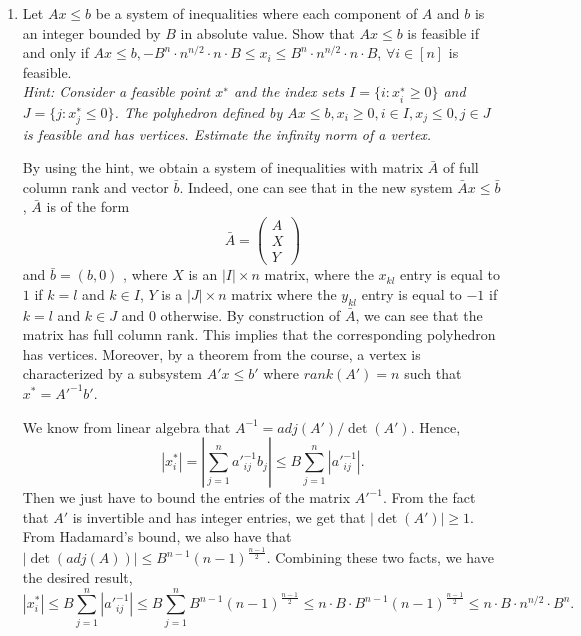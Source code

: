 \documentclass[11pt]{article}
\renewcommand{\leq}{\leqslant}
\begin{document}
\begin{enumerate}[1)]
\item Let $Ax≤b$ be a system of inequalities where each component of $A$ and $b$ is an integer bounded by
$B$ in absolute value. Show that $Ax≤b$ is feasible if and only if $Ax≤b ,−B^n \cdot n^{n/2}\cdot n\cdot B ≤x_i ≤ B^n\cdot n^{n/2}\cdot n\cdot B$, $∀i∈[n]$ is feasible. \\

\textit{Hint: Consider a feasible point $x^∗$ and the index sets $I= \{i: x^∗_i ≥0\}$ and $J= \{j : x^∗_j ≤0\}$. The
polyhedron defined by $Ax≤b, x_i ≥0, i∈I, x_j ≤0, j ∈J$ is feasible and has vertices. Estimate the infinity norm of a vertex.}

\begin{solution}
By using the hint, we obtain a system of inequalities with matrix $\bar{A}$ of full column rank and vector $\bar{b}$. Indeed, one can see that in the new system $\bar{A}x≤\bar{b}$, $\bar{A}$ is of the form $$\bar{A} = \begin{pmatrix} A \\ X \\ Y \end{pmatrix}$$ 
and $\bar{b}= (b, 0)$ , where $X$ is an $|I|×n$ matrix, where the $x_{kl}$ entry is equal to $1$ if $k=l$ and $k ∈I$,
$Y$ is a $|J|×n$ matrix where the $y_{kl}$ entry is equal to $-1$ if $k= l$ and $k ∈J$ and $0$ otherwise.
By construction of $\bar{A}$, we can see that the matrix has full column rank.
This implies that the corresponding polyhedron has vertices. Moreover, by a theorem from the
course, a vertex is characterized by a subsystem $A'x≤b'$ where $rank(A') = n$ such that $x^\ast
= A'^{−1}b'$.

We know from linear algebra that $A^{−1 }= adj(A')/\det(A').$
Hence,
$$|x^\ast_i| = \left| \displaystyle\sum_{j =1}^n {a'}_{ij}^{-1} b_j \right| \leq B \displaystyle\sum_{j =1}^n \left|  {a'}_{ij}^{-1} \right|.$$
Then we just have to bound the entries of the matrix $A'^{−1}$. From the fact that $A'$ is invertible and has integer entries, we get that $|\det(A')| ≥ 1$. From Hadamard’s bound, we also have that
$|\det(adj(A))|≤B^{n−1}(n−1)^{\frac{n−1}{2}}$. Combining these two facts, we have the desired result,
$$|x^\ast_i| \leq B \displaystyle\sum_{j =1}^n \left|  {a'}_{ij}^{-1} \right| \leq B \displaystyle\sum_{j =1}^n B^{n-1} (n-1)^{\frac{n-1}{2}} \leq n \cdot B \cdot B^{n-1} (n-1)^{\frac{n-1}{2}} \leq n\cdot B \cdot n^{n/2} \cdot B^n.$$

\end{solution}




\end{enumerate}
\end{document}
